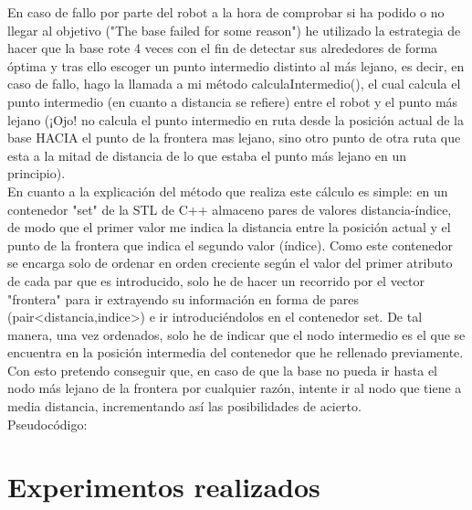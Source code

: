 En caso de fallo por parte del robot a la hora de comprobar si ha podido o no llegar al objetivo ("The base failed for some reason") he utilizado la estrategia de hacer que la base rote 4 veces con el fin de detectar sus alrededores de forma óptima y tras ello escoger un punto intermedio distinto al más lejano, es decir, en caso de fallo, hago la llamada a mi método calculaIntermedio(), el cual calcula el punto intermedio (en cuanto a distancia se refiere) entre el robot y el punto más lejano (¡Ojo! no calcula el punto intermedio en ruta desde la posición actual de la base HACIA el punto de la frontera mas lejano, sino otro punto de otra ruta que esta a la mitad de distancia de lo que estaba el punto más lejano en un principio). \\
En cuanto a la explicación del método que realiza este cálculo es simple: en un contenedor "set" de la STL de C++ almaceno pares de valores distancia-índice, de modo que el primer valor me indica la distancia entre la posición actual y el punto de la frontera que indica el segundo valor (índice). Como este contenedor se encarga solo de ordenar en orden creciente según el valor del primer atributo de cada par que es introducido, solo he de hacer un recorrido por el vector "frontera" para ir extrayendo su información en forma de pares (pair<distancia,indice>) e ir introduciéndolos en el contenedor set. De tal manera, una vez ordenados, solo he de indicar que el nodo intermedio es el que se encuentra en la posición intermedia del contenedor que he rellenado previamente. Con esto pretendo conseguir que, en caso de que la base no pueda ir hasta el nodo más lejano de la frontera por cualquier razón, intente ir al nodo que tiene a media distancia, incrementando así las posibilidades de acierto.\\


Pseudocódigo:

\begin{algorithmic}[1]
	\EndFor
	
\end{algorithmic}

\newpage

\section{Experimentos realizados}

